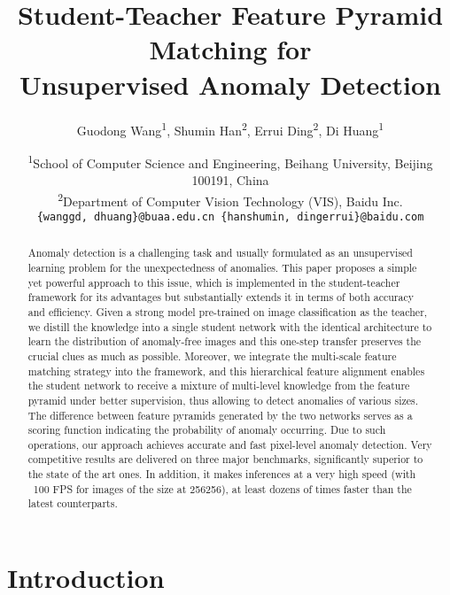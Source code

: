 \documentclass[final]{cvpr}
\begin{document}
\title{Student-Teacher Feature Pyramid Matching for \\
	Unsupervised Anomaly Detection}

\author{Guodong Wang\textsuperscript{1}, Shumin Han\textsuperscript{2}, Errui Ding\textsuperscript{2}, Di Huang\textsuperscript{1}  \and
\textsuperscript{1}School of Computer Science and Engineering, Beihang University, Beijing 100191, China\\
\textsuperscript{2}Department of Computer Vision Technology (VIS), Baidu Inc.\\
{\tt\small \{wanggd, dhuang\}@buaa.edu.cn \{hanshumin, dingerrui\}@baidu.com}
}


\maketitle


\begin{abstract}
Anomaly detection is a challenging task and usually formulated as an unsupervised learning problem for the unexpectedness of anomalies. This paper proposes a simple yet powerful approach to this issue, which is implemented in the student-teacher framework for its advantages but substantially extends it in terms of both accuracy and efficiency. Given a strong model pre-trained on image classification as the teacher, we distill the knowledge into a single student network with the identical architecture to learn the distribution of anomaly-free images and this one-step transfer preserves the crucial clues as much as possible. Moreover, we integrate the multi-scale feature matching strategy into the framework, and this hierarchical feature alignment enables the student network to receive a mixture of multi-level knowledge from the feature pyramid under better supervision, thus allowing to detect anomalies of various sizes. The difference between feature pyramids generated by the two networks serves as a scoring function indicating the probability of anomaly occurring. Due to such operations, our approach achieves accurate and fast pixel-level anomaly detection. Very competitive results are delivered on three major benchmarks, significantly superior to the state of the art ones. In addition, it makes inferences at a very high speed (with ~100 FPS for images of the size at 256256), at least dozens of times faster than the latest counterparts.
\end{abstract}


\section{Introduction}
\end{document}
